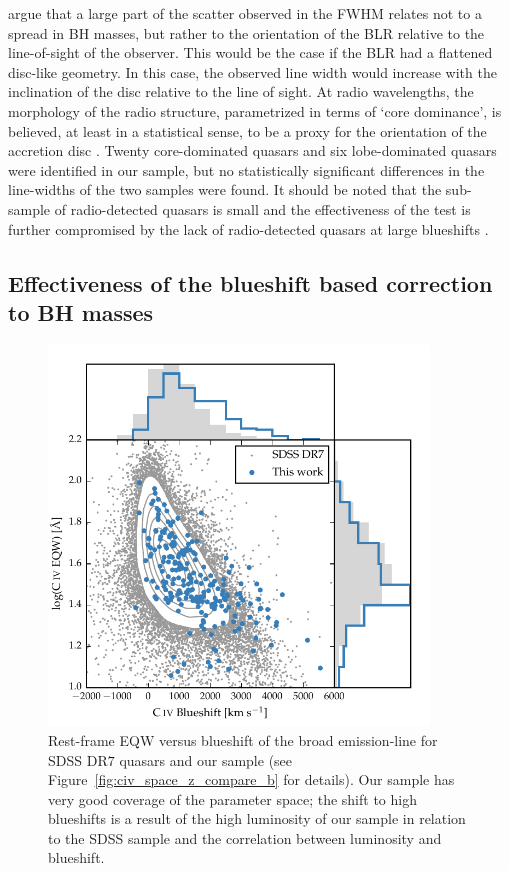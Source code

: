 \citet{shen14} argue that a large part of the scatter observed in the \hb FWHM relates not to a spread in BH masses, but rather to the orientation of the BLR relative to the line-of-sight of the observer.
This would be the case if the BLR had a flattened disc-like geometry. 
In this case, the observed line width would increase with the inclination of the disc relative to the line of sight. 
At radio wavelengths, the morphology of the radio structure, parametrized in terms of `core dominance', is believed, at least in a statistical sense, to be a proxy for the orientation of the accretion disc \citep[e.g.][]{jackson91}.
Twenty core-dominated quasars and six lobe-dominated quasars were identified in our sample, but no statistically significant differences in the \ha line-widths of the two samples were found. 
It should be noted that the sub-sample of radio-detected quasars is small and the effectiveness of the test is further compromised by the lack of radio-detected quasars at large blueshifts \citep[see figure 14 of][for example]{richards11}.

\subsection{Effectiveness of the  blueshift based correction to BH masses}
\label{sec:effectiveness}

\begin{figure}[t!]
    \centering
    \includegraphics[width=0.9\textwidth]{figures/chapter03/civ_space.pdf} 
    \caption[{Rest-frame EQW versus blueshift of the broad  emission-line for our sample and for SDSS quasars.}]{Rest-frame EQW versus blueshift of the broad  emission-line for SDSS DR$7$ quasars and our sample (see Figure~\ref{fig:civ_space_z_compare_b} for details). Our sample has very good coverage of the parameter space; the shift to high blueshifts is a result of the high luminosity of our sample in relation to the SDSS sample and the correlation between luminosity and  blueshift.} 
    \label{fig:civ_space}
\end{figure}

